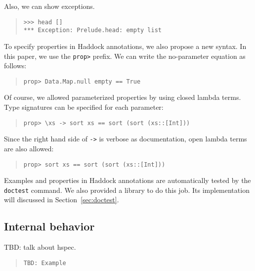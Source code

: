 \documentclass[preprint]{sigplanconf}
\begin{document}
\noindent Also, we can show exceptions.

\begin{quote}
\small
\begin{verbatim}
>>> head []
*** Exception: Prelude.head: empty list
\end{verbatim}
\end{quote}

To specify properties in Haddock annotations, we also propose a new syntax. In this paper, we use the {\tt prop>} prefix. We can write the no-parameter equation as follows:

\begin{quote}
\small
\begin{verbatim}
prop> Data.Map.null empty == True
\end{verbatim}
\end{quote}

\noindent Of course, we allowed parameterized properties by
using closed lambda terms.
Type signatures can be specified for each parameter:

\begin{quote}
\small
\begin{verbatim}
prop> \xs -> sort xs == sort (sort (xs::[Int]))
\end{verbatim}
\end{quote}

\noindent Since the right hand side of {\tt ->} is verbose as documentation,
open lambda terms are also allowed:

\begin{quote}
\small
\begin{verbatim}
prop> sort xs == sort (sort (xs::[Int]))
\end{verbatim}
\end{quote}

Examples and properties in Haddock annotations are automatically
tested by the {\tt doctest} command. We also provided a library
to do this job. Its implementation will discussed in Section~\ref{sec:doctest}.

\subsection{Internal behavior}
\label{sec:Internal-behavior}

TBD: talk about hspec.

\begin{quote}
\small
\begin{verbatim}
TBD: Example
\end{verbatim}
\end{quote}
\end{document}
